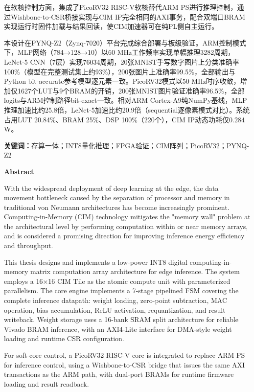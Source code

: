 \documentclass[12pt, a4paper]{article}
\begin{document}
在软核控制方面，集成了PicoRV32 RISC-V软核替代ARM PS进行推理控制，通过Wishbone-to-CSR桥接实现与CIM IP完全相同的AXI事务，配合双端口BRAM实现运行时固件加载与结果回读，使CIM加速器可在纯PL侧自主运行。

本设计在PYNQ-Z2（Zynq-7020）平台完成综合部署与板级验证。ARM控制模式下，MLP网络（784→128→10）以60 MHz工作频率实现单幅推理3282周期，LeNet-5 CNN（7层）实现76034周期，20张MNIST手写数字图片上分类准确率100\%（模型在完整测试集上约93\%），200张图片上准确率99.5\%，全部输出与Python bit-accurate参考模型逐元素一致。PicoRV32模式以50 MHz时序收敛，增加仅1627个LUT与9个BRAM的开销，200张MNIST图片验证准确率96.5\%，全部logits与ARM控制路径bit-exact一致。相对ARM Cortex-A9纯NumPy基线，MLP推理加速比约25.8倍，LeNet-5加速比约20.9倍（sequential逐像素模式对比）。系统占用LUT 20.84\%、BRAM 25\%、DSP 100\%（220个），CIM IP动态功耗仅0.284 W。

\vspace{1em}
\noindent\textbf{关键词：}存算一体；INT8量化推理；FPGA验证；CIM阵列；PicoRV32；PYNQ-Z2

\newpage

\begin{center}
	{\large\bfseries Abstract}
\end{center}

With the widespread deployment of deep learning at the edge, the data movement bottleneck caused by the separation of processor and memory in traditional von Neumann architectures has become increasingly prominent. Computing-in-Memory (CIM) technology mitigates the "memory wall" problem at the architectural level by performing computation within or near memory arrays, and is considered a promising direction for improving inference energy efficiency and throughput.

This thesis designs and implements a low-power INT8 digital computing-in-memory matrix computation array architecture for edge inference. The system employs a 16×16 CIM Tile as the atomic compute unit with parameterized parallelism. The core engine implements a 7-stage pipelined FSM covering the complete inference datapath: weight loading, zero-point subtraction, MAC operation, bias accumulation, ReLU activation, requantization, and result writeback. Weight storage uses a 16-bank SRAM split architecture for reliable Vivado BRAM inference, with an AXI4-Lite interface for DMA-style weight loading and runtime CSR configuration.

For soft-core control, a PicoRV32 RISC-V core is integrated to replace ARM PS for inference control, using a Wishbone-to-CSR bridge that issues the same AXI transactions as the ARM path, with dual-port BRAMs for runtime firmware loading and result readback.
\end{document}
